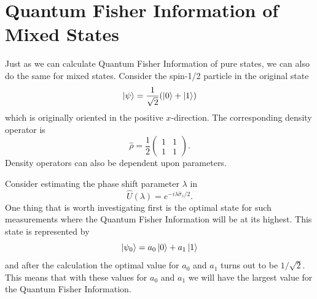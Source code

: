 \documentclass[twocolumn]{article}
\begin{document}
\section*{Quantum Fisher Information of Mixed States}
Just as we can calculate Quantum Fisher Information of pure states, we can also do the same for mixed states. Consider the spin-1/2 particle in the original state
\begin{equation} \label{eq:69}
\ket{\psi}=\frac{1}{\sqrt{2}}(\ket{0}+\ket{1})
\end{equation}
which is originally oriented in the positive $x$-direction. The corresponding density operator is
\begin{equation} \label{eq:70}
\hat{\rho}=\frac{1}{2}
\begin{pmatrix}
1 & 1 \\
1 & 1
\end{pmatrix}.
\end{equation}
Density operators can also be dependent upon parameters.

Consider estimating the phase shift parameter $\lambda$ in
\begin{equation} \label{eq:71}
\hat{U}(\lambda)=e^{-i\lambda\hat{\sigma}_z/2}.
\end{equation}
One thing that is worth investigating first is the optimal state for such measurements where the Quantum Fisher Information will be at its highest. This state is represented by
\begin{equation} \label{eq:72}
\ket{\psi_0}=a_0\ket{0}+a_1\ket{1}
\end{equation}
and after the calculation the optimal value for $a_0$ and $a_1$ turns out to be $1/\sqrt{2}$. This means that with these values for $a_0$ and $a_1$ we will have the largest value for the Quantum Fisher Information. 
\end{document}
